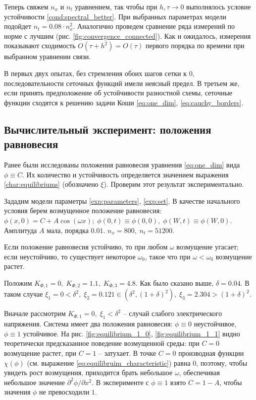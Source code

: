Теперь свяжем $n_x$ и $n_t$ уравнением, так чтобы при $h, \tau \to 0$ выполнялось условие устойчивости \eqref{cond:spectral_better}. При выбранных параметрах модели подойдет $n_t = 0.08 \cdot n_x^2$. Аналогично проведем сравнение ряда измерений по норме с лучшим (рис. \ref{fig:convergence_connected}). Как и ожидалось, измерения показывают сходимость $O(\tau + h^2) = O(\tau)$ первого порядка по времени при выбранном уравнении связи.

В первых двух опытах, без стремления обоих шагов сетки к $0$, последовательности сеточных функций имели неясный предел. В третьем же, если принять предположение об устойчивости разностной схемы, сеточные функции сходятся к решению задачи Коши \eqref{eq:one_dim}, \eqref{eq:cauchy_borders}.


\subsection{Вычислительный эксперимент: положения равновесия}

Ранее были исследованы положения равновесия уравнения \eqref{eq:one_dim} вида $\phi \equiv C$. Их количество и устойчивость определяется значением выражения \eqref{char:equilibriums} (обозначено $\xi$). Проверим этот результат экспериментально.

Зададим модели параметры \eqref{exp:parameters}, \eqref{exp:set}. В качестве начального условия берем возмущенное положение равновесия: $\phi(x, 0) = C + A \cos(\omega x); \; \phi(0, t) \equiv \phi(0, 0), \; \phi(W, t) \equiv \phi(W, 0)$. Амплитуда $A$ мала, порядка $0.01$. $n_x = 800, \; n_t = 51200$.

Если положение равновесия устойчиво, то при любом $\omega$ возмущение угасает; если неустойчиво, то существует некоторое $\omega_0$, такое что при $\omega < \omega_0$ возмущение растет.

Положим $K_{\Phi, 1} = 0, \; K_{\Phi, 2} = 1.1, \; K_{\Phi, 3} = 4.8$. Как было сказано выше, $\delta = 0.04$. В таком случае $\xi_1 = 0 < \delta^2, \; \xi_2 = 0.121 \in (\delta^2, (1 + \delta)^2), \; \xi_3 = 2.304 > (1 + \delta)^2$.

Вначале рассмотрим $K_{\Phi, 1} = 0, \; \xi_1 < \delta^2$ -- случай слабого электрического напряжения. Система имеет два положения равновесия: $\phi \equiv 0$ неустойчивое, $\phi \equiv 1$ устойчивое. На рис. \ref{fig:equilibrium_1_0}, \ref{fig:equilibrium_1_1} видно теоретически предсказанное поведение возмущенной среды: при $C = 0$ возмущение растет, при $C = 1$ -- затухает. В точке $C = 0$ производная функции $\chi(\phi)$ (см. выражение \eqref{eq:equilibruim_characteristic}) равна $0$, поэтому, чтобы увидеть рост возмущения, приходится брать небольшое $\omega$, обеспечивая небольшое значение $\partial^2 \phi / \partial x^2$. В эксперименте с $\phi \equiv 1$ взято $C = 1 - A$, чтобы значения $\phi$ не превосходили $1$.

